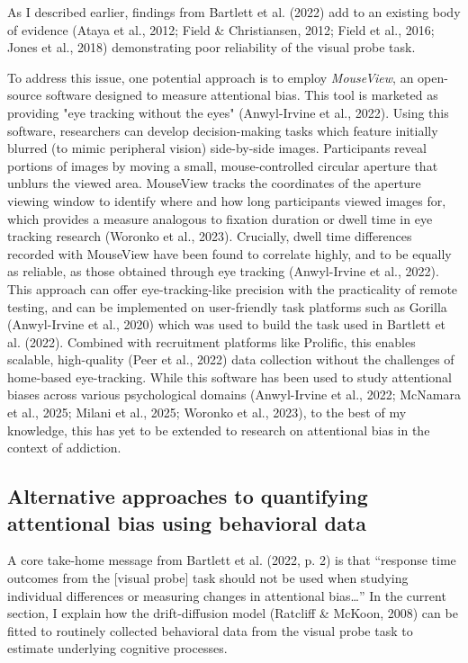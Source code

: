 \documentclass[authordate, empirical]{jote-new-article}
\begin{document}
	As I described earlier, findings from Bartlett et al. (2022) add to an existing body of evidence (Ataya et al., 2012; Field \& Christiansen, 2012; Field et al., 2016; Jones et al., 2018) demonstrating poor reliability of the visual probe task.



	To address this issue, one potential approach is to employ \emph{MouseView}, an open-source software designed to measure attentional bias. This tool is marketed as providing "eye tracking without the eyes" (Anwyl-Irvine et al., 2022). Using this software, researchers can develop decision-making tasks which feature initially blurred (to mimic peripheral vision) side-by-side images. Participants reveal portions of images by moving a small, mouse-controlled circular aperture that unblurs the viewed area. MouseView tracks the coordinates of the aperture viewing window to identify where and how long participants viewed images for, which provides a measure analogous to fixation duration or dwell time in eye tracking research (Woronko et al., 2023). Crucially, dwell time differences recorded with MouseView have been found to correlate highly, and to be equally as reliable, as those obtained through eye tracking (Anwyl-Irvine et al., 2022). This approach can offer eye-tracking-like precision with the practicality of remote testing, and can be implemented on user-friendly task platforms such as Gorilla (Anwyl-Irvine et al., 2020) which was used to build the task used in Bartlett et al. (2022). Combined with recruitment platforms like Prolific, this enables scalable, high-quality (Peer et al., 2022) data collection without the challenges of home-based eye-tracking. While this software has been used to study attentional biases across various psychological domains (Anwyl-Irvine et al., 2022; McNamara et al., 2025; Milani et al., 2025; Woronko et al., 2023), to the best of my knowledge, this has yet to be extended to research on attentional bias in the context of addiction.



	\subsection{Alternative approaches to quantifying attentional bias using behavioral data}



	A core take-home message from Bartlett et al. (2022, p. 2) is that “response time outcomes from the [visual probe] task should not be used when studying individual differences or measuring changes in attentional bias…” In the current section, I explain how the drift-diffusion model (Ratcliff \& McKoon, 2008) can be fitted to routinely collected behavioral data from the visual probe task to estimate underlying cognitive processes.
\end{document}
